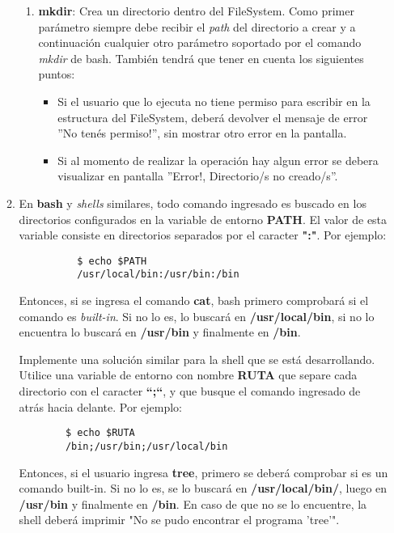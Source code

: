 \begin{enumerate}
\begin{enumerate}
\begin{enumerate}
	     \item \textbf{mkdir}: Crea un directorio dentro del FileSystem. Como primer parámetro siempre debe recibir el \textit{path} del directorio a crear y a continuación cualquier otro parámetro soportado por el comando \emph{mkdir} de bash. También tendrá que tener en cuenta los siguientes puntos:
	     \begin{itemize}
	     	\item Si el usuario que lo ejecuta no tiene permiso para escribir en la estructura del FileSystem, deberá devolver el mensaje de error ”No tenés permiso!”, sin mostrar otro error en la pantalla.
	     	\item Si al momento de realizar la operación hay algun error se debera visualizar en pantalla ”Error!, Directorio/s no creado/s”.
	     \end{itemize}	      
	    \end{enumerate}

	    \item En \textbf{bash} y \textit{shells} similares, todo comando ingresado es buscado en los directorios configurados en la variable de entorno \textbf{PATH}. El valor de esta variable consiste en directorios separados por el caracter \textbf{":"}. Por ejemplo:
	    \begin{lstlisting}
		  $ echo $PATH
		  /usr/local/bin:/usr/bin:/bin
	    \end{lstlisting}
	    
	    Entonces, si se ingresa el comando \textbf{cat}, bash primero comprobará si el comando es \textit{built-in}. Si no lo es, lo buscará en \textbf{/usr/local/bin}, si no lo encuentra lo buscará en \textbf{/usr/bin} y finalmente en \textbf{/bin}.
	    
	    
	    Implemente una solución similar para la shell que se está desarrollando. Utilice una variable de entorno con nombre \textbf{RUTA} que separe cada directorio con el caracter \textbf{``;``}, y que busque el comando ingresado de atrás hacia delante. Por ejemplo:
	    \begin{lstlisting}
		$ echo $RUTA
		/bin;/usr/bin;/usr/local/bin
	    \end{lstlisting}
	    Entonces, si el usuario ingresa \textbf{tree}, primero se deberá comprobar si es un comando built-in. Si no lo es, se lo buscará en \textbf{/usr/local/bin/}, luego en \textbf{/usr/bin} y finalmente en \textbf{/bin}. En caso de que no se lo encuentre, la shell deberá imprimir "No se pudo encontrar el programa 'tree'".
      \end{enumerate}


\end{enumerate}
